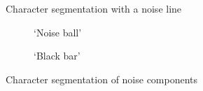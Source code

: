 \newpage


\begin{figure}[ht]
  \centering
  \caption{Character segmentation with a noise line}
  \label{fig:results:bl}
\end{figure}




\begin{figure}[ht]
  \centering
  \begin{subfigure}{0.49\textwidth}
    \centering
    \caption{`Noise ball'}
    \label{fig:results:noise:nb}
  \end{subfigure}
  \begin{subfigure}{0.49\textwidth}
    \centering
    \caption{`Black bar'}
    \label{fig:results:noise:bb}
  \end{subfigure}
  \caption{Character segmentation of noise components}
  \label{fig:results:noise}
\end{figure}






